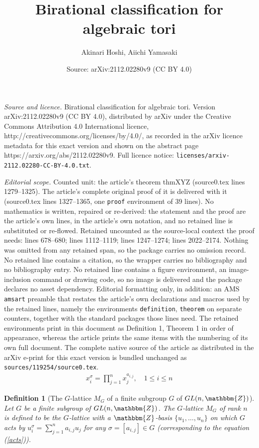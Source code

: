 \documentclass[10pt,a4paper]{amsart}
\title{Birational classification for algebraic tori}
\author{Akinari Hoshi, Aiichi Yamasaki}
\date{Source: arXiv:2112.02280v9 (CC BY 4.0)}
\newtheorem{definition}{Definition}
\newcommand{\GL}{{\rm GL}}\newcommand{\SL}{{\rm SL}}
\newcommand{\bZ}{\mathbbm{Z}}\newcommand{\bQ}{\mathbbm{Q}}
\begin{document}
\maketitle

\noindent\emph{Source and licence.} Birational classification for algebraic tori. Version arXiv:2112.02280v9 (CC BY 4.0), distributed by arXiv under the Creative Commons Attribution 4.0 International licence, http://creativecommons.org/licenses/by/4.0/, as recorded in the arXiv licence metadata for this exact version and shown on the abstract page https://arxiv.org/abs/2112.02280v9. Full licence notice: \texttt{licenses/arxiv-2112.02280-CC-BY-4.0.txt}.\par\smallskip

\noindent\textit{Editorial scope.} Counted unit: the article's theorem thmXYZ (source0.tex lines 1279--1325). The article's complete original proof of it is delivered with it (source0.tex lines 1327--1365, one \texttt{proof} environment of 39 lines). No mathematics is written, repaired or re-derived: the statement and the proof are the article's own lines, in the article's own notation, and no retained line is substituted or re-flowed.  Retained uncounted as the source-local context the proof needs: lines 678--680; lines 1112--1119; lines 1247--1274; lines 2022--2174.  Nothing was omitted from any retained span, so the package carries no omission record.  No retained line contains a citation, so the wrapper carries no bibliography and no bibliography entry.  No retained line contains a figure environment, an image-inclusion command or drawing code, so no image is delivered and the package declares no asset dependency.  Editorial formatting only, in addition: an AMS \texttt{amsart} preamble that restates the article's own declarations and macros used by the retained lines, namely the environments \texttt{definition}, \texttt{theorem} on separate counters, together with the standard packages those lines need.  The retained environments print in this document as Definition 1, Theorem 1 in order of appearance, whereas the article prints the same items with the numbering of its own full document.  The complete native source of the article as distributed in the arXiv e-print for this exact version is bundled unchanged as \texttt{sources/119254/source0.tex}.
\begin{align}
x_i^{\sigma}=\prod_{j=1}^n x_j^{a_{i,j}},\quad 1\leq i\leq n\label{acts}
\end{align}

\begin{definition}[The $G$-lattice $M_G$ of a finite subgroup $G$ of 
$\GL(n,\bZ)$]\label{d2.2} 
Let $G$ be a finite subgroup of $\GL(n,\bZ)$. 
{\it The $G$-lattice $M_G$ of rank $n$} 
is defined to be the $G$-lattice with a $\bZ$-basis $\{u_1,\ldots,u_n\}$ 
on which $G$ acts by $u_i^{\sigma}=\sum_{j=1}^n a_{i,j}u_j$ for any $
\sigma=[a_{i,j}]\in G$ (corresponding to the equation (\ref{acts})). 
\end{definition}
\end{document}

